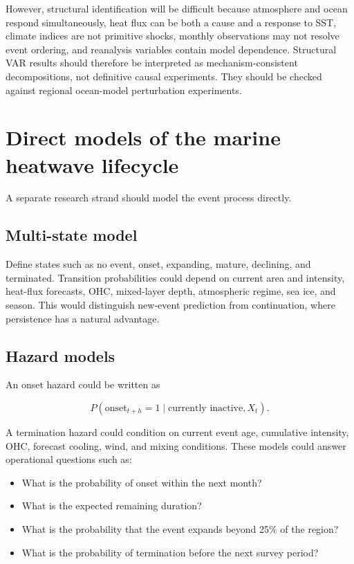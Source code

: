 \documentclass[11pt]{article}
\newcommand{\MHW}{marine heatwave}
\begin{document}
However, structural identification will be difficult because atmosphere and ocean respond simultaneously, heat flux can be both a cause and a response to SST, climate indices are not primitive shocks, monthly observations may not resolve event ordering, and reanalysis variables contain model dependence. Structural VAR results should therefore be interpreted as mechanism-consistent decompositions, not definitive causal experiments. They should be checked against regional ocean-model perturbation experiments.

\section{Direct models of the \MHW{} lifecycle}

A separate research strand should model the event process directly.

\subsection{Multi-state model}

Define states such as no event, onset, expanding, mature, declining, and terminated. Transition probabilities could depend on current area and intensity, heat-flux forecasts, OHC, mixed-layer depth, atmospheric regime, sea ice, and season. This would distinguish new-event prediction from continuation, where persistence has a natural advantage.

\subsection{Hazard models}

An onset hazard could be written as

\begin{equation}
P(\text{onset}_{t+h}=1\mid \text{currently inactive},X_t).
\end{equation}

A termination hazard could condition on current event age, cumulative intensity, OHC, forecast cooling, wind, and mixing conditions. These models could answer operational questions such as:

\begin{itemize}
  \item What is the probability of onset within the next month?
  \item What is the expected remaining duration?
  \item What is the probability that the event expands beyond 25\% of the region?
  \item What is the probability of termination before the next survey period?
\end{itemize}
\end{document}
